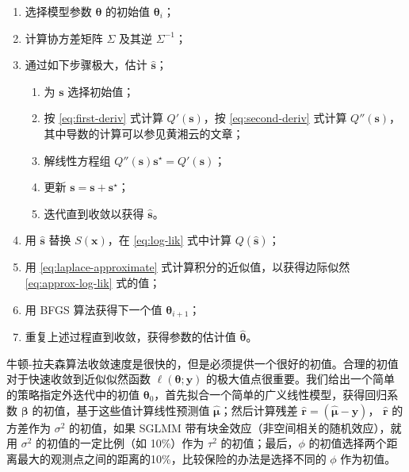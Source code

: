 \documentclass[12pt,a4paper,UTF8,twoside]{book}
\providecommand{\tightlist}{%
  \setlength{\itemsep}{0pt}\setlength{\parskip}{0pt}}
\theoremstyle{definition}
\theoremstyle{definition}
\theoremstyle{definition}
\theoremstyle{remark}
\begin{document}
\begin{enumerate}
\def\labelenumi{\arabic{enumi}.}
\tightlist
\item
  选择模型参数 \(\boldsymbol{\theta}\) 的初始值
  \(\boldsymbol{\theta}_{i}\)；
\item
  计算协方差矩阵 \(\Sigma\) 及其逆 \(\Sigma^{-1}\)；
\item
  通过如下步骤极大，估计 \(\hat{\mathbf{s}}\)；

  \begin{enumerate}
  \def\labelenumii{(\alph{enumii})}
  \tightlist
  \item
    为 \(\mathbf{s}\) 选择初始值；
  \item
    按 \eqref{eq:first-deriv} 式计算 \(Q'(\mathbf{s})\)，按
    \eqref{eq:second-deriv} 式计算
    \(Q''(\mathbf{s})\)，其中导数的计算可以参见黄湘云的文章\citep{Huang2016COS}；
  \item
    解线性方程组
    \(Q''(\mathbf{s})\mathbf{s}^{\star} = Q'(\mathbf{s})\)；
  \item
    更新 \(\mathbf{s = s + s^{\star}}\)；
  \item
    迭代直到收敛以获得 \(\hat{\mathbf{s}}\)。
  \end{enumerate}
\item
  用 \(\hat{\mathbf{s}}\) 替换 \(S(\mathbf{x})\)，在 \eqref{eq:log-lik}
  式中计算 \(Q(\hat{\mathbf{s}})\)；
\item
  用 \eqref{eq:laplace-approximate} 式计算积分的近似值，以获得边际似然
  \eqref{eq:approx-log-lik} 式的值；
\item
  用 BFGS 算法获得下一个值 \(\boldsymbol{\theta}_{i+1}\)；
\item
  重复上述过程直到收敛，获得参数的估计值 \(\hat{\boldsymbol{\theta}}\)。
\end{enumerate}

牛顿-拉夫森算法收敛速度是很快的，但是必须提供一个很好的初值。合理的初值对于快速收敛到近似似然函数
\(\ell(\boldsymbol{\theta};\mathbf{y})\)
的极大值点很重要。我们给出一个简单的策略指定外迭代中的初值
\(\boldsymbol{\theta}_{0}\)，首先拟合一个简单的广义线性模型，获得回归系数
\(\boldsymbol{\beta}\) 的初值，基于这些值计算线性预测值
\(\hat{\boldsymbol{\mu}}\)；然后计算残差
\(\hat{\boldsymbol{r}} = (\hat{\boldsymbol{\mu}} - \mathbf{y})\)，
\(\hat{\boldsymbol{r}}\) 的方差作为 \(\sigma^2\) 的初值，如果 SGLMM
带有块金效应（非空间相关的随机效应），就用 \(\sigma^2\)
的初值的一定比例（如 10\%）作为 \(\tau^2\) 的初值；最后，\(\phi\)
的初值选择两个距离最大的观测点之间的距离的10\%，比较保险的办法是选择不同的
\(\phi\) 作为初值。
\end{document}
